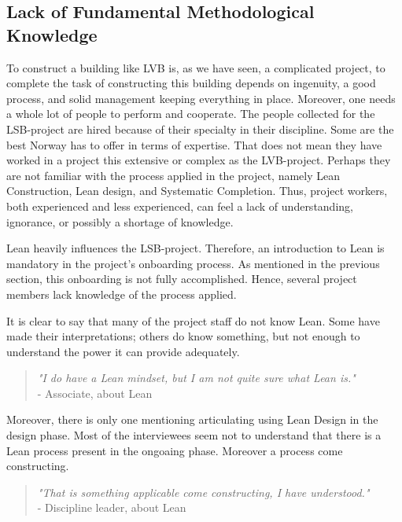 

\subsection{Lack of Fundamental Methodological Knowledge} \label{sec:lack_of_knowledge}
To construct a building like LVB is, as we have seen, a complicated project, to complete the task of constructing this building depends on ingenuity, a good process, and solid management keeping everything in place. Moreover, one needs a whole lot of people to perform and cooperate. The people collected for the LSB-project are hired because of their specialty in their discipline. Some are the best Norway has to offer in terms of expertise. That does not mean they have worked in a project this extensive or complex as the LVB-project. Perhaps they are not familiar with the process applied in the project, namely Lean Construction, Lean design, and Systematic Completion. Thus, project workers, both experienced and less experienced, can feel a lack of understanding, ignorance, or possibly a shortage of knowledge. 

Lean heavily influences the LSB-project. Therefore, an introduction to Lean is mandatory in the project's onboarding process. As mentioned in the previous section, this onboarding is not fully accomplished. Hence, several project members lack knowledge of the process applied. 

It is clear to say that many of the project staff do not know Lean. Some have made their interpretations; others do know something, but not enough to understand the power it can provide adequately.  

\begin{quote}
    \textit{"I do have a Lean mindset, but I am not quite sure what Lean is."} \\
    - Associate, about Lean 
\end{quote}

Moreover, there is only one mentioning articulating using Lean Design in the design phase. Most of the interviewees seem not to understand that there is a Lean process present in the ongoaing phase. Moreover a process come constructing. 

\begin{quote}
    \textit{"That is something applicable come constructing, I have understood."} \\
    - Discipline leader, about Lean
\end{quote}

